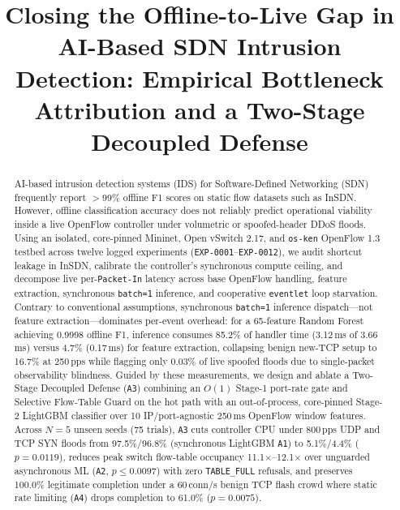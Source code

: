 \documentclass[conference]{IEEEtran}
\begin{document}
\title{Closing the Offline-to-Live Gap in AI-Based SDN Intrusion Detection: Empirical Bottleneck Attribution and a Two-Stage Decoupled Defense}

\author{
}

\maketitle

\begin{abstract}
AI-based intrusion detection systems (IDS) for Software-Defined Networking (SDN) frequently report $>$99\% offline F1 scores on static flow datasets such as InSDN. However, offline classification accuracy does not reliably predict operational viability inside a live OpenFlow controller under volumetric or spoofed-header DDoS floods. Using an isolated, core-pinned Mininet, Open vSwitch 2.17, and \texttt{os-ken} OpenFlow 1.3 testbed across twelve logged experiments (\texttt{EXP-0001}--\texttt{EXP-0012}), we audit shortcut leakage in InSDN, calibrate the controller's synchronous compute ceiling, and decompose live per-\texttt{Packet-In} latency across base OpenFlow handling, feature extraction, synchronous \texttt{batch=1} inference, and cooperative \texttt{eventlet} loop starvation. Contrary to conventional assumptions, synchronous \texttt{batch=1} inference dispatch---not feature extraction---dominates per-event overhead: for a 65-feature Random Forest achieving 0.9998 offline F1, inference consumes 85.2\% of handler time (3.12\,ms of 3.66\,ms) versus 4.7\% (0.17\,ms) for feature extraction, collapsing benign new-TCP setup to 16.7\% at 250\,pps while flagging only 0.03\% of live spoofed floods due to single-packet observability blindness. Guided by these measurements, we design and ablate a Two-Stage Decoupled Defense (\texttt{A3}) combining an $O(1)$ Stage-1 port-rate gate and Selective Flow-Table Guard on the hot path with an out-of-process, core-pinned Stage-2 LightGBM classifier over 10 IP/port-agnostic 250\,ms OpenFlow window features. Across $N=5$ unseen seeds (75 trials), \texttt{A3} cuts controller CPU under 800\,pps UDP and TCP SYN floods from 97.5\%/96.8\% (synchronous LightGBM \texttt{A1}) to 5.1\%/4.4\% ($p=0.0119$), reduces peak switch flow-table occupancy 11.1$\times$--12.1$\times$ over unguarded asynchronous ML (\texttt{A2}, $p \le 0.0097$) with zero \texttt{TABLE\_FULL} refusals, and preserves 100.0\% legitimate completion under a 60\,conn/s benign TCP flash crowd where static rate limiting (\texttt{A4}) drops completion to 61.0\% ($p=0.0075$).
\end{abstract}
\end{document}
